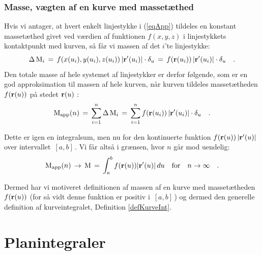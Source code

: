 \subsubsection{Masse, vægten af en kurve med massetæthed}\label{subsecMasseKurve}
Hvis vi antager, at
hvert enkelt linjestykke i (\ref{eqApp}) tildeles en konstant
massetæthed givet ved værdien af funktionen $f(x,y,z)$ i
linjestykkets kontaktpunkt med kurven, så får vi massen af det $i$'te
linjestykke:
$$
\Delta \operatorname{M}_{i} \, = \, f(x(u_{i}), y(u_{i}), z(u_{i}))\, | {\bf
r}'(u_{i}) | \cdot\delta_{u} \, = \, f({\bf{r}}(u_{i}))\, | {\bf
r}'(u_{i}) | \cdot\delta_{u}\quad .
$$
Den totale masse af hele systemet af linjestykker er derfor
følgende, som er en god approksimation til massen af hele kurven,
når kurven tildeles massetætheden $f({\bf r}(u))$ på stedet ${\bf
r}(u)$ :
\begin{equation}
\operatorname{M}_{\operatorname{app}}(n) \, = \,   \sum_{i=1}^{n} \Delta \operatorname{M}_{i} \, = \,
\sum_{i=1}^{n}f({\bf r}(u_{i}))\, | {\bf r}'(u_{i}) | \cdot \delta_{u}
\quad .
\end{equation}

Dette er igen en integralsum, men nu for den kontinuerte funktion
$f({\bf r}(u))\, | {\bf r}'(u) | $ over intervallet $\,[a,
b]\,$. Vi får altså i grænsen, hvor $n$ går mod uendelig:
\begin{equation}
\operatorname{M}_{\operatorname{app}}(n)\, \to \, \operatorname{M} \, = \, \int_{a}^{b}f({\bf r}(u)) | {\bf
r}'(u) | \,du \quad \text{for} \quad n \to \infty \quad.
\end{equation}

Dermed har vi motiveret definitionen af massen af en kurve med
massetætheden $f({\bf r}(u))$ (for så vidt denne funktion er
positiv i $\,[a,b]\,$) og dermed den generelle definition af
kurveintegralet, Definition \ref{defKurveInt}.




\section{Planintegraler} \label{secPlanInt}


